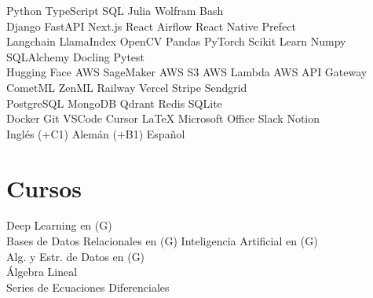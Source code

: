 \documentclass[]{tex/deedy-resume-openfont}
\begin{document}
\begin{minipage}[t]{0.32\textwidth}
Python \textbullet{} 
TypeScript \textbullet{} 
SQL \textbullet{} 
Julia \textbullet{} 
Wolfram \textbullet{} 
Bash \\[4pt]

Django \textbullet{} 
FastAPI \textbullet{} 
Next.js \textbullet{} 
React \textbullet{} 
Airflow \textbullet{} 
React Native \textbullet{} 
Prefect \\[4pt]


Langchain \textbullet{} 
LlamaIndex \textbullet{} 
OpenCV \textbullet{} 
Pandas \textbullet{} 
PyTorch \textbullet{} 
Scikit Learn \textbullet{} 
Numpy \textbullet{} 
SQLAlchemy \textbullet{} 
Docling \textbullet{} 
Pytest \\[4pt]

Hugging Face \textbullet{} 
AWS SageMaker \textbullet{} 
AWS S3 \textbullet{} 
AWS Lambda \textbullet{} 
AWS API Gateway \textbullet{} 
CometML \textbullet{} 
ZenML \textbullet{} 
Railway \textbullet{} 
Vercel \textbullet{} 
Stripe \textbullet{} 
Sendgrid \\[4pt]

PostgreSQL \textbullet{} 
MongoDB \textbullet{} 
Qdrant \textbullet{} 
Redis \textbullet{} 
SQLite \\[4pt]

Docker \textbullet{} 
Git \textbullet{} 
VSCode \textbullet{} 
Cursor \textbullet{} 
\LaTeX{} \textbullet{} 
Microsoft Office \textbullet{} 
Slack \textbullet{} 
Notion \\[6pt]

Inglés ($+$C1) \textbullet{} Alemán ($+$B1) \textbullet{} Español


\section{Cursos}
Deep Learning en (G)\\
Bases de Datos Relacionales en  (G)
Inteligencia Artificial en  (G)\\
Alg. y Estr. de Datos en  (G)\\
Álgebra Lineal\\
Series de Ecuaciones Diferenciales\\


\end{minipage}
\end{document}
